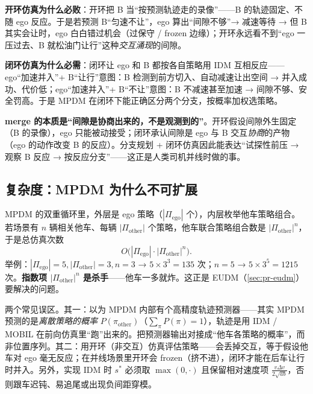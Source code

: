 \textbf{开环仿真为什么必败}：开环把 B 当“按预测轨迹走的录像”——B 的轨迹固定、不随 ego 反应。于是若预测 B“匀速不让”，ego 算出“间隙不够”→ 减速等待 → 但 B 其实会让时，ego 白白错过机会（过保守 / frozen 边缘）；开环永远看不到“ego 一压过去、B 就松油门让行”这种\emph{交互涌现}的间隙。

\textbf{闭环仿真为什么必需}：闭环让 ego 和 B 都按各自策略用 IDM 互相反应——ego“加速并入”+ B“让行”意图：B 检测到前方切入、自动减速让出空间 → 并入成功、代价低；ego“加速并入”+ B“不让”意图：B 不减速甚至加速 → 间隙不够、安全罚高。于是 MPDM 在闭环下能正确区分两个分支，按概率加权选策略。

\begin{insight}
\textbf{merge 的本质是“间隙是协商出来的，不是观测到的”}。开环假设间隙外生固定（B 的录像），ego 只能被动接受；闭环承认间隙是 ego 与 B 交互\emph{协商}的产物（ego 的动作改变 B 的反应）。分支规划 + 闭环仿真因此能表达“试探性前压 → 观察 B 反应 → 按反应分支”——这正是人类司机并线时做的事。
\end{insight}

\subsection{复杂度：MPDM 为什么不可扩展}
\label{sec:pr-mpdm-complexity}

MPDM 的双重循环里，外层是 ego 策略（$|\Pi_{\mathrm{ego}}|$ 个），内层枚举他车策略组合。若场景有 $n$ 辆相关他车、每辆 $|\Pi_{\mathrm{other}}|$ 个策略，他车联合策略组合数是 $|\Pi_{\mathrm{other}}|^{n}$，于是总仿真次数
\begin{equation}
  O\big(|\Pi_{\mathrm{ego}}|\cdot|\Pi_{\mathrm{other}}|^{n}\big).
  \label{eq:pr-mpdm-complexity}
\end{equation}
举例：$|\Pi_{\mathrm{ego}}|=5,|\Pi_{\mathrm{other}}|=3,n=3$ → $5\times3^3=135$ 次；$n=5$ → $5\times3^5=1215$ 次。\textbf{指数项 $|\Pi_{\mathrm{other}}|^{n}$ 是杀手}——他车一多就炸。这正是 EUDM（\cref{sec:pr-eudm}）要解决的问题。

\begin{pitfall}
两个常见误区。其一：以为 MPDM 内部有个高精度轨迹预测器——其实 MPDM 预测的是\emph{离散策略的概率} $P(\pi_{\mathrm{other}})$（$\sum_\pi P(\pi)=1$），轨迹是用 IDM / MOBIL 在前向仿真里“跑”出来的。把预测器输出对接成“他车各策略的概率”，而非位置序列。其二：用开环（非交互）仿真评估策略——会丢掉交互，等于假设他车对 ego 毫无反应；在并线场景里开环会 frozen（挤不进），闭环才能在后车让行时并入。另外，实现 IDM 时 $s^*$ 必须取 $\max(0,\cdot)$ 且保留相对速度项 $\frac{v\Delta v}{2\sqrt{ab}}$，否则跟车迟钝、易追尾或出现负间距穿模。
\end{pitfall}


